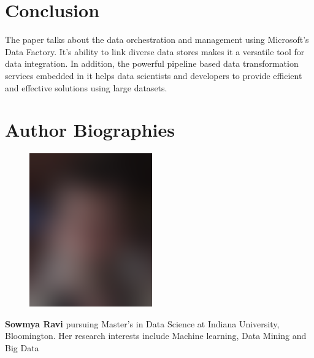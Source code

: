 \documentclass[9pt,twocolumn,twoside]{styles/osajnl}
\begin{document}
\section{Conclusion}
The paper talks about the data orchestration and management using Microsoft's Data Factory. It's ability to link diverse data stores makes it a versatile tool for data integration. In addition, the powerful pipeline based data transformation services embedded in it helps data scientists and developers to provide efficient and effective solutions using large datasets. 



 
\section*{Author Biographies}
\begingroup
\setlength\intextsep{0pt}
\begin{minipage}[t][3.2cm][t]{1.0\columnwidth} %
  \begin{figure}
    \includegraphics[width=0.25\columnwidth]{images/john_smith.eps}
  \end{figure}
  \noindent
  {\bfseries Sowmya Ravi} pursuing Master's in Data Science at Indiana University, Bloomington. Her research interests include Machine learning, Data Mining and Big Data
\end{minipage}

\endgroup

\newpage
\end{document}
